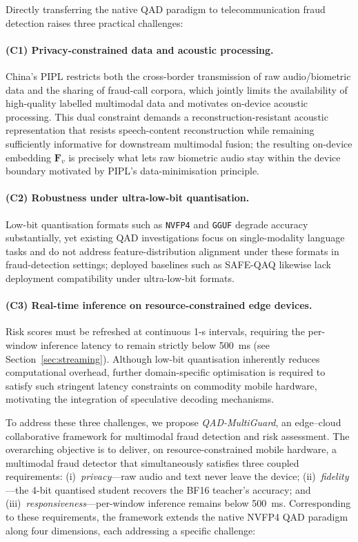\documentclass[a4paper,fleqn]{cas-sc}
\begin{document}
Directly transferring the native QAD paradigm to telecommunication fraud detection raises three practical challenges:

\paragraph{(C1) Privacy-constrained data and acoustic processing.}
China's PIPL restricts both the cross-border transmission of raw audio/biometric data and the sharing of fraud-call corpora, which jointly limits the availability of high-quality labelled multimodal data and motivates on-device acoustic processing. This dual constraint demands a reconstruction-resistant acoustic representation that resists speech-content reconstruction while remaining sufficiently informative for downstream multimodal fusion; the resulting on-device embedding $\bm{F}_v$ is precisely what lets raw biometric audio stay within the device boundary motivated by PIPL's data-minimisation principle.

\paragraph{(C2) Robustness under ultra-low-bit quantisation.}
Low-bit quantisation formats such as \texttt{NVFP4} and \texttt{GGUF} degrade accuracy substantially, yet existing QAD investigations focus on single-modality language tasks and do not address feature-distribution alignment under these formats in fraud-detection settings; deployed baselines such as SAFE-QAQ likewise lack deployment compatibility under ultra-low-bit formats.

\paragraph{(C3) Real-time inference on resource-constrained edge devices.}
Risk scores must be refreshed at continuous 1-s intervals, requiring the per-window inference latency to remain strictly below 500~ms (see Section~\ref{sec:streaming}). Although low-bit quantisation inherently reduces computational overhead, further domain-specific optimisation is required to satisfy such stringent latency constraints on commodity mobile hardware, motivating the integration of speculative decoding mechanisms.

To address these three challenges, we propose \textit{QAD-MultiGuard}, an edge--cloud collaborative framework for multimodal fraud detection and risk assessment. The overarching objective is to deliver, on resource-constrained mobile hardware, a multimodal fraud detector that simultaneously satisfies three coupled requirements: (i)~\textit{privacy}---raw audio and text never leave the device; (ii)~\textit{fidelity}---the 4-bit quantised student recovers the BF16 teacher's accuracy; and (iii)~\textit{responsiveness}---per-window inference remains below 500~ms. Corresponding to these requirements, the framework extends the native NVFP4 QAD paradigm along four dimensions, each addressing a specific challenge:
\end{document}
